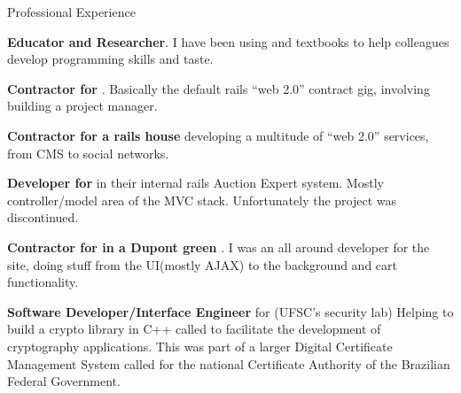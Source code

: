 \begin{rubric}{Professional Experience}{



    \entry*[2009]
        \textbf{Educator and Researcher}. I have been using 
         and
        textbooks to help colleagues develop programming skills and taste.

    \entry*[2009] 
        \textbf{Contractor for
        }. Basically the
        default rails ``web 2.0'' contract gig, involving building a project
        manager.

    \entry*[2007 - 2008] 
        \textbf{Contractor for  a rails house} 
        developing a multitude of ``web 2.0'' services, from CMS to social networks.

    \entry*[2007] 
        \textbf{Developer for } 
        in their internal rails Auction Expert system. Mostly controller/model area of
        the MVC stack. Unfortunately the project was discontinued.

    \entry*[2007] 
        \textbf{Contractor for  
        in a Dupont green }.
        I was an all around developer for the site, doing stuff from the
        UI(mostly AJAX) to the background and cart functionality.

    \entry*[2005 - 2007] 
        \textbf{Software Developer/Interface Engineer} for
        (UFSC's security
        lab) Helping to build a crypto library in C++ called
        to facilitate the development of cryptography applications. This was
        part of a larger Digital Certificate Management System  called
         for the
        national Certificate Authority of the Brazilian Federal Government.

}\end{rubric}

